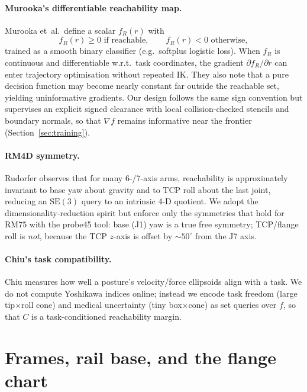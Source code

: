 \documentclass[11pt,a4paper]{article}
\newcommand{\SE}{\mathrm{SE}}
\begin{document}
\paragraph{Murooka's differentiable reachability map.}
Murooka et~al.\ define a scalar \(f_{R}(r)\) with
\begin{equation}
\label{eq:murooka}
  f_{R}(r)\ge 0 \text{ if reachable},\qquad
  f_{R}(r)< 0 \text{ otherwise},
\end{equation}
trained as a smooth binary classifier (e.g.\ softplus logistic loss). When
\(f_{R}\) is continuous and differentiable w.r.t.\ task coordinates, the
gradient \(\partial f_{R}/\partial r\) can enter trajectory optimisation
without repeated IK. They also note that a pure decision function may become
nearly constant far outside the reachable set, yielding uninformative
gradients. Our design follows the same sign convention but supervises an
explicit signed clearance with local collision-checked stencils and boundary
normals, so that \(\nabla f\) remains informative near the frontier
(Section~\ref{sec:training}).

\paragraph{RM4D symmetry.}
Rudorfer observes that for many 6-/7-axis arms, reachability is approximately
invariant to base yaw about gravity and to TCP roll about the last joint,
reducing an \(\SE(3)\) query to an intrinsic 4-D quotient. We adopt the
dimensionality-reduction spirit but enforce only the symmetries that hold for
RM75 with the probe45 tool: base (J1) yaw is a true free symmetry; TCP/flange
roll is \emph{not}, because the TCP \(z\)-axis is offset by \(\sim 50^{\circ}\)
from the J7 axis.

\paragraph{Chiu's task compatibility.}
Chiu measures how well a posture's velocity/force ellipsoids align with a
task. We do not compute Yoshikawa indices online; instead we encode task
freedom (large tip$\times$roll cone) and medical uncertainty (tiny box$\times$cone)
as set queries over \(f\), so that \(C\) is a task-conditioned reachability
margin.

\section{Frames, rail base, and the flange chart}
\label{sec:chart}
\end{document}
